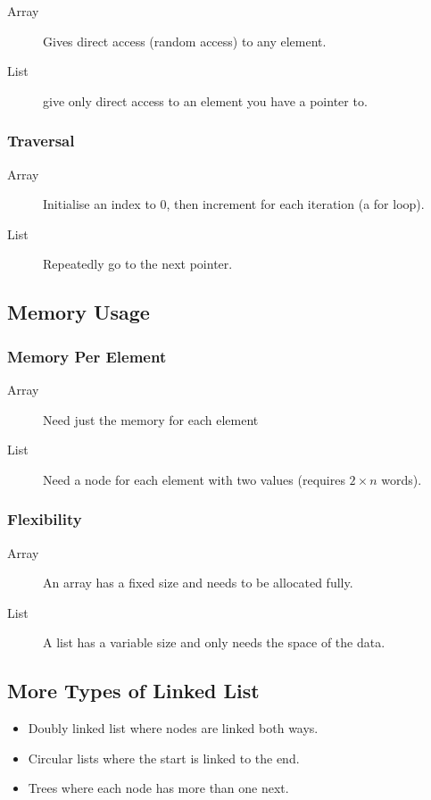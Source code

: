 \begin{description}
	\item[Array] Gives direct access (random access) to any element.
	\item[List] give only direct access to an element you have a pointer to.
\end{description}

\subsubsection{Traversal}\label{ssub:traversal}

\begin{description}
	\item[Array] Initialise an index to \(0\), then increment for each iteration (a for loop).
	\item[List] Repeatedly go to the next pointer.
\end{description}

\subsection{Memory Usage}\label{sub:memory_usage}

\subsubsection{Memory Per Element}\label{ssub:memory_per_element}

\begin{description}
	\item[Array] Need just the memory for each element
	\item[List] Need a node for each element with two values (requires \(2 \times n\) words).
\end{description}

\subsubsection{Flexibility}\label{ssub:flexibility}

\begin{description}
	\item[Array] An array has a fixed size and needs to be allocated fully.
	\item[List] A list has a variable size and only needs the space of the data.
\end{description}

\subsection{More Types of Linked List}\label{sub:more_types_of_linked_list}

\begin{itemize}
	\item Doubly linked list where nodes are linked both ways.
	\item Circular lists where the start is linked to the end.
	\item Trees where each node has more than one next.
\end{itemize}

